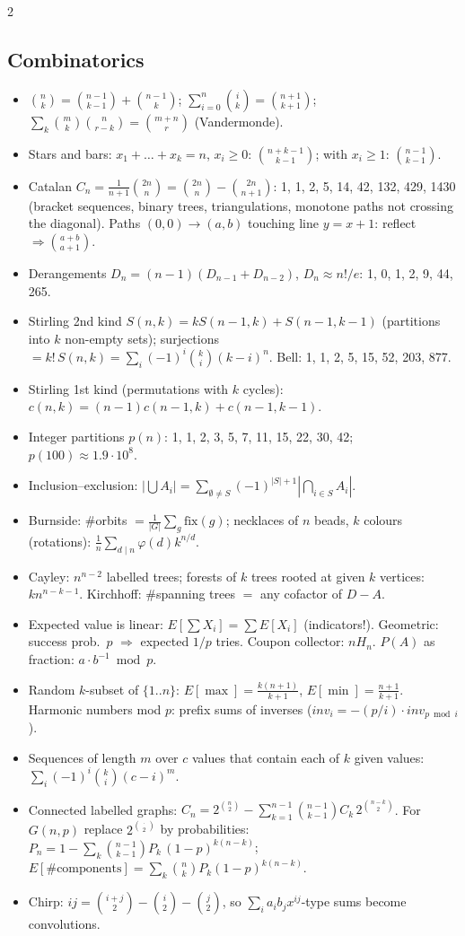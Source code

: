 \documentclass[8pt,a4paper]{extarticle}
\begin{document}
\begin{multicols*}{2}
\subsection{Combinatorics}
\begin{itemize}
\item $\binom{n}{k}=\binom{n-1}{k-1}+\binom{n-1}{k}$;
  $\sum_{i=0}^{n}\binom{i}{k}=\binom{n+1}{k+1}$;
  $\sum_k\binom{m}{k}\binom{n}{r-k}=\binom{m+n}{r}$ (Vandermonde).
\item Stars and bars: $x_1+\dots+x_k=n$, $x_i\ge0$:
  $\binom{n+k-1}{k-1}$; with $x_i\ge1$: $\binom{n-1}{k-1}$.
\item Catalan $C_n=\frac{1}{n+1}\binom{2n}{n}=\binom{2n}{n}-\binom{2n}{n+1}$:
  1, 1, 2, 5, 14, 42, 132, 429, 1430 (bracket sequences, binary trees,
  triangulations, monotone paths not crossing the diagonal).
  Paths $(0,0)\to(a,b)$ touching line $y=x+1$: reflect $\Rightarrow
  \binom{a+b}{a+1}$.
\item Derangements $D_n=(n-1)(D_{n-1}+D_{n-2})$, $D_n\approx n!/e$: 1, 0, 1, 2, 9, 44, 265.
\item Stirling 2nd kind $S(n,k)=kS(n-1,k)+S(n-1,k-1)$ (partitions into
  $k$ non-empty sets); surjections $=k!\,S(n,k)=\sum_i(-1)^i\binom{k}{i}(k-i)^n$.
  Bell: 1, 1, 2, 5, 15, 52, 203, 877.
\item Stirling 1st kind (permutations with $k$ cycles):
  $c(n,k)=(n-1)c(n-1,k)+c(n-1,k-1)$.
\item Integer partitions $p(n)$: 1, 1, 2, 3, 5, 7, 11, 15, 22, 30, 42;
  $p(100)\approx 1.9\cdot10^8$.
\item Inclusion--exclusion: $|\bigcup A_i|=\sum_{\emptyset\neq S}(-1)^{|S|+1}|\bigcap_{i\in S}A_i|$.
\item Burnside: \#orbits $=\frac{1}{|G|}\sum_{g}\mathrm{fix}(g)$; necklaces
  of $n$ beads, $k$ colours (rotations): $\frac1n\sum_{d\mid n}\varphi(d)k^{n/d}$.
\item Cayley: $n^{n-2}$ labelled trees; forests of $k$ trees rooted at
  given $k$ vertices: $k n^{n-k-1}$. Kirchhoff: \#spanning trees $=$ any
  cofactor of $D-A$.
\item Expected value is linear: $E[\sum X_i]=\sum E[X_i]$ (indicators!).
  Geometric: success prob.\ $p$ $\Rightarrow$ expected $1/p$ tries.
  Coupon collector: $n H_n$. $P(A)$ as fraction: $a\cdot b^{-1} \bmod p$.
\item Random $k$-subset of $\{1..n\}$: $E[\max]=\frac{k(n+1)}{k+1}$,
  $E[\min]=\frac{n+1}{k+1}$. Harmonic numbers mod $p$: prefix sums of
  inverses ($inv_i = -(p/i)\cdot inv_{p \bmod i}$).
\item Sequences of length $m$ over $c$ values that contain each of $k$
  given values: $\sum_i (-1)^i\binom{k}{i}(c-i)^m$.
\item Connected labelled graphs: $C_n = 2^{\binom n2} -
  \sum_{k=1}^{n-1}\binom{n-1}{k-1} C_k\, 2^{\binom{n-k}2}$. For $G(n,p)$
  replace $2^{\binom{\cdot}2}$ by probabilities: $P_n=1-\sum_k\binom{n-1}{k-1}
  P_k\,(1-p)^{k(n-k)}$; $E[\#\text{components}]=\sum_k\binom nk P_k(1-p)^{k(n-k)}$.
\item Chirp: $ij=\binom{i+j}2-\binom i2-\binom j2$, so
  $\sum_i a_i b_j x^{ij}$-type sums become convolutions.
\end{itemize}


\end{multicols*}
\end{document}

